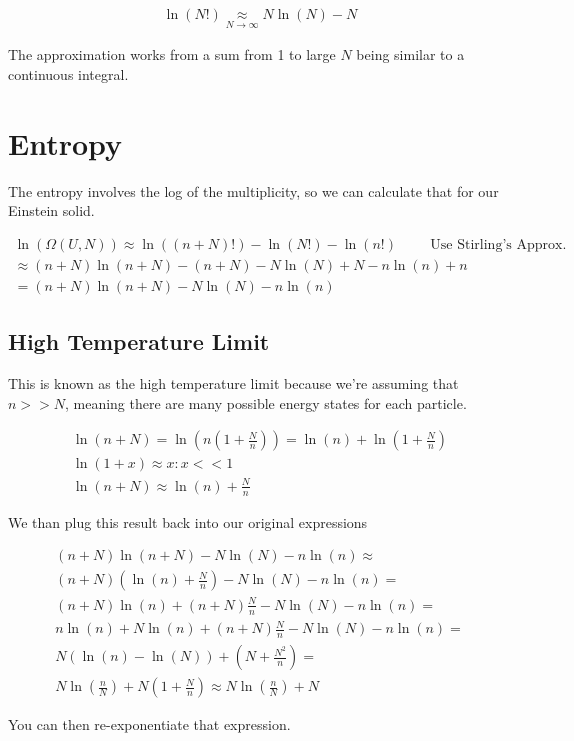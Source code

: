 \documentclass[fleqn]{report}
\newcommand{\hp}{\hspace{1cm}}
\newcommand{\equations} [1] {
\begin{gather*}
#1
\end{gather*}
}
\begin{document}
\equations{
    \ln(N!)
    \underset{N \to \infty}{\approx} 
    N \ln(N) - N
}
The approximation works from 
a sum from 1 to large $N$ being similar to a continuous integral.

\section{Entropy}
The entropy involves the log of the multiplicity, so we can calculate that 
for our Einstein solid. 

\equations{
    \ln(\Omega(U, N))
    \approx 
    \ln((n + N)!)
    -
    \ln(N!)
    -
    \ln(n!)
    \hp 
    \textrm{Use Stirling's Approx.}
    \\
    \approx 
    (n + N) \ln(n + N) - (n + N)
    -
    N \ln(N) + N - n \ln(n) + n
    \\
    =
    (n + N)\ln(n + N)
    -
    N \ln(N) - n \ln(n)
}

\subsection{High Temperature Limit}
This is known as the high temperature limit 
because we're assuming that $n >> N$, meaning there are many 
possible energy states for each particle.

\equations{
    \ln(n + N)
    =
    \ln(n \left( 1 + \frac{N}{n} \right))
    =
    \ln(n)
    +
    \ln(1 + \frac{N}{n} )
    \\
    \ln(1+x) \approx x: x << 1
    \\
    \ln(n + N)
    \approx 
    \ln(n)
    +
    \frac{N}{n}
}

We than plug this result back into our original expressions 

\equations{
    (n + N)\ln(n + N)
    -
    N \ln(N) - n \ln(n)
    \approx 
    \\
    (n + N) (\ln(n) + \frac{N}{n})
    -
    N \ln(N) - n \ln(n)
    =
    \\
    (n + N)\ln(n) + (n + N)\frac{N}{n}
    -
    N \ln(N) - n \ln(n)
    =
    \\
    n \ln(n) + N \ln(n) + (n + N)\frac{N}{n}
    -
    N \ln(N) - n \ln(n)
    =
    \\
    N (\ln(n) - \ln(N)) + (N + \frac{N^2}{n})
    =
    \\
    N \ln(\frac{n}{N})
    +
    N(1 + \frac{N}{n})
    \approx 
    N \ln(\frac{n}{N})
    + N
}

You can then re-exponentiate that expression. 
\end{document}
